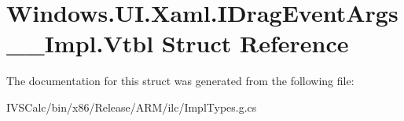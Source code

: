 \hypertarget{struct_windows_1_1_u_i_1_1_xaml_1_1_i_drag_event_args_____impl_1_1_vtbl}{}\section{Windows.\+U\+I.\+Xaml.\+I\+Drag\+Event\+Args\+\_\+\+\_\+\+Impl.\+Vtbl Struct Reference}
\label{struct_windows_1_1_u_i_1_1_xaml_1_1_i_drag_event_args_____impl_1_1_vtbl}


The documentation for this struct was generated from the following file\+:\begin{DoxyCompactItemize}
\item 
I\+V\+S\+Calc/bin/x86/\+Release/\+A\+R\+M/ilc/Impl\+Types.\+g.\+cs\end{DoxyCompactItemize}
